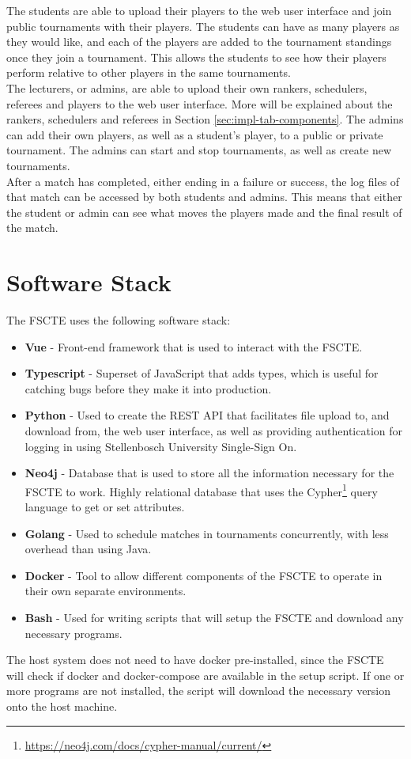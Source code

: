 \documentclass[a4paper, 11pt]{report}
\begin{document}
The students are able to upload their players to the web user interface and join
public tournaments with their players. The students can have as many players as
they would like, and each of the players are added to the tournament standings
once they join a tournament. This allows the students to see how their players
perform relative to other players in the same tournaments. \\

The lecturers, or admins, are able to upload their own rankers, schedulers,
referees and players to the web user interface. More will be explained about the
rankers, schedulers and referees in Section \ref{sec:impl-tab-components}. The
admins can add their own players, as well as a student's player, to a public or
private tournament. The admins can start and stop tournaments, as well as create
new tournaments. \\

After a match has completed, either ending in a failure or success, the log files
of that match can be accessed by both students and admins. This means that
either the student or admin can see what moves the players made and the
final result of the match.

\section{Software Stack}

The FSCTE uses the following software stack:
\begin{itemize}
	\item \textbf{Vue} - Front-end framework that is used to interact with the
	FSCTE.
	\item \textbf{Typescript} - Superset of JavaScript that adds types, which
	is useful for catching bugs before they make it into production.
	\item \textbf{Python} - Used to create the REST API that facilitates
	file upload to, and download from, the web user interface, as well as providing
	authentication for logging in using Stellenbosch University Single-Sign On.
	\item \textbf{Neo4j} - Database that is used to store all the information
	necessary for the FSCTE to work. Highly relational database that uses the
	Cypher\footnote{\url{https://neo4j.com/docs/cypher-manual/current/}} query
	language to get or set attributes.
	\item \textbf{Golang} - Used to schedule matches in tournaments concurrently,
	with less overhead than using Java.
	\item \textbf{Docker} - Tool to allow different components of the FSCTE to
	operate in their own separate environments.
	\item \textbf{Bash} - Used for writing scripts that will setup the FSCTE and
	download any necessary programs.
\end{itemize}
The host system does not need to have docker pre-installed, since the FSCTE will
check if docker and docker-compose are available in the setup script. If one or
more programs are not installed, the script will download the necessary version
onto the host machine.
\end{document}
